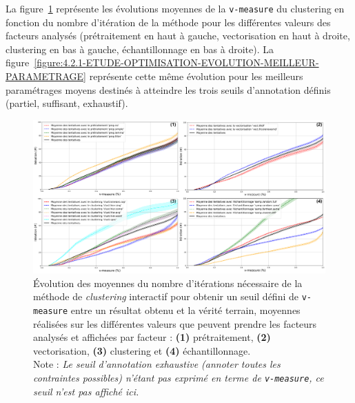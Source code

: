 		
			La figure~\ref{figure:4.2.1-ETUDE-OPTIMISATION-EVOLUTION-PAR-FACTEURS} représente les évolutions moyennes de la \texttt{v-measure} du clustering en fonction du nombre d'itération de la méthode pour les différentes valeurs des facteurs analysés (prétraitement en haut à gauche, vectorisation en haut à droite, clustering en bas à gauche, échantillonnage en bas à droite).
			La figure~\ref{figure:4.2.1-ETUDE-OPTIMISATION-EVOLUTION-MEILLEUR-PARAMETRAGE} représente cette même évolution pour les meilleurs paramétrages moyens destinés à atteindre les trois seuils d'annotation définis (partiel, suffisant, exhaustif).
			\begin{figure}[!htb]
				\centering
				\includegraphics[width=\textwidth]{figures/etude-efficience-evolution-moyenne-par-vmeasure-par-facteur}
				\caption{Évolution des moyennes du nombre d'itérations nécessaire de la méthode de \textit{clustering} interactif pour obtenir un seuil défini de \texttt{v-measure} entre un résultat obtenu et la vérité terrain, moyennes réalisées sur les différentes valeurs que peuvent prendre les facteurs analysés et affichées par facteur : \textbf{(1)} prétraitement, \textbf{(2)} vectorisation, \textbf{(3)} clustering et \textbf{(4)} échantillonnage. \\
				Note : \textit{Le seuil d'annotation exhaustive (annoter toutes les contraintes possibles) n'étant pas exprimé en terme de \texttt{v-measure}, ce seuil n'est pas affiché ici.}}
				\label{figure:4.2.1-ETUDE-OPTIMISATION-EVOLUTION-PAR-FACTEURS}
			\end{figure}
